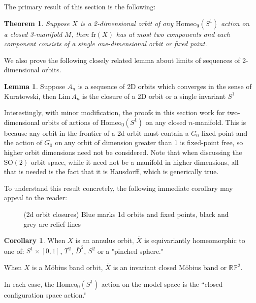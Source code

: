 \documentclass[10pt, oneside]{article}
\newcommand{\RP}{\mathbb{RP}}
\newcommand{\SO}[1][2]{\text{SO}(#1)}
\newcommand{\homeo}[1][S^1]{\text{Homeo}_0(#1)}
\newcommand{\klim}[1]{\text{Lim}\,#1}
\newtheorem{thm}{Theorem}[section]
\theoremstyle{definition}
\newtheorem{lem}{Lemma}[section]
\newtheorem{cor}{Corollary}[section]
\theoremstyle{definition}
\begin{document}
The primary result of this section is the following:

\begin{thm}\label{thm:2d-orbit-cpctification}
    Suppose $X$ is a 2-dimensional orbit of any $\homeo$ action on a closed 3-manifold $M$, then $\text{fr}(X)$ has at most two components and each component consists of a single one-dimensional orbit or fixed point. 
\end{thm}

We also prove the following closely related lemma about limits of sequences of 2-dimensional orbits.

\begin{lem}\label{lem:seq-of-annuli}
    Suppose $A_n$ is a sequence of 2D orbits which converges in the sense of Kuratowski, then $\klim A_n$ is the closure of a 2D orbit or a single invariant $S^1$
\end{lem}

Interestingly, with minor modification, the proofs in this section work for two-dimensional orbits of actions of $\homeo$ on any closed $n$-manifold. This is because any orbit in the frontier of a 2d orbit must contain a $G_0$ fixed point and the action of $G_0$ on any orbit of dimension greater than 1 is fixed-point free, so higher orbit dimensions need not be considered. Note that when discussing the $\SO$ orbit space, while it need not be a manifold in higher dimensions, all that is needed is the fact that it is Hausdorff, which is generically true.

To understand this result concretely, the following immediate corollary 
may appeal to the reader:

\begin{figure}[b]
    \centering
    
    \caption{(2d orbit closures) Blue marks 1d orbits and fixed points, black and grey are relief lines}
    \label{fig:2d-orbit-compactifications}
\end{figure}

\begin{cor}\label{cor:2d-orbit-closures}
    When $X$ is an annulus orbit, $\bar{X}$ is equivariantly homeomorphic to one of: $S^1\times [0,1]$, $T^2$, $\bar{D}^2$, $S^2$ or a "pinched sphere." 
    
    When $X$ is a M\"{o}bius band orbit, $\bar{X}$ is an invariant closed M\"{o}bius band or $\RP^2$.

    In each case, the $\homeo$ action on the model space is the ``closed configuration space action.''
\end{cor}
\end{document}
